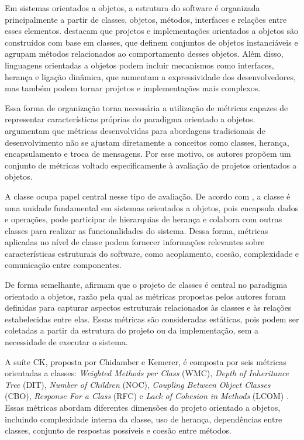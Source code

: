 Em sistemas orientados a objetos, a estrutura do software é organizada principalmente a partir de classes, objetos, métodos, interfaces 
e relações entre esses elementos.  destacam que projetos e implementações orientados a objetos são construídos 
com base em classes, que definem conjuntos de objetos instanciáveis e agrupam métodos relacionados ao comportamento desses objetos. 
Além disso, linguagens orientadas a objetos podem incluir mecanismos como interfaces, herança e ligação dinâmica, que aumentam a 
expressividade dos desenvolvedores, mas também podem tornar projetos e implementações mais complexos.

Essa forma de organização torna necessária a utilização de métricas capazes de representar características próprias do paradigma 
orientado a objetos.  argumentam que métricas desenvolvidas para abordagens tradicionais de desenvolvimento 
não se ajustam diretamente a conceitos como classes, herança, encapsulamento e troca de mensagens. Por esse motivo, os autores 
propõem um conjunto de métricas voltado especificamente à avaliação de projetos orientados a objetos.

A classe ocupa papel central nesse tipo de avaliação. De acordo com , a classe é uma unidade fundamental 
em sistemas orientados a objetos, pois encapsula dados e operações, pode participar de hierarquias de herança e colabora com 
outras classes para realizar as funcionalidades do sistema. Dessa forma, métricas aplicadas no nível de classe podem fornecer 
informações relevantes sobre características estruturais do software, como acoplamento, coesão, complexidade e comunicação 
entre componentes.

De forma semelhante,  afirmam que o projeto de classes é central no paradigma orientado a objetos, 
razão pela qual as métricas propostas pelos autores foram definidas para capturar aspectos estruturais relacionados às classes 
e às relações estabelecidas entre elas. Essas métricas são consideradas estáticas, pois podem ser coletadas a partir da estrutura 
do projeto ou da implementação, sem a necessidade de executar o sistema.

A suíte CK, proposta por Chidamber e Kemerer, é composta por seis métricas orientadas a classes: \textit{Weighted Methods per Class} 
(WMC), \textit{Depth of Inheritance Tree} (DIT), \textit{Number of Children} (NOC), \textit{Coupling Between Object Classes} (CBO), 
\textit{Response For a Class} (RFC) e \textit{Lack of Cohesion in Methods} (LCOM) \cite{chidamber1994}. Essas métricas abordam 
diferentes dimensões do projeto orientado a objetos, incluindo complexidade interna da classe, uso de herança, dependências 
entre classes, conjunto de respostas possíveis e coesão entre métodos.

